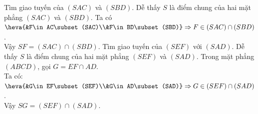 \begin{ex}
{\begin{itemchoice}
			 Tìm giao tuyến của $\left( SAC \right)$ và ${(S B D)}$.
			Dễ thấy ${S}$  là điểm chung của hai mặt phẳng ${(S A C)}$ và ${(S B D)}$.
			Ta có $\heva{&F\in AC\subset(SAC)\\&F\in BD\subset(SBD)}\Rightarrow F\in \left( SAC  \right)\cap \left( SBD \right) $.\\
			 Vậy $SF=\left( SAC \right)\cap \left( SBD \right)$.
			\itemch Tìm giao  tuyến của ${(S E F)}$ với ${(S A D)}$.
			Dễ thấy ${S}$ là điểm  chung của hai mặt phẳng ${(S E F)}$ và ${(S A D)}$.
			Trong mặt phẳng $\left( ABCD \right)$, gọi ${G=E F \cap  A D}$.\\
			Ta có: $\heva{&G\in EF\subset(SEF)\\&G\in AD\subset(SAD)}\Rightarrow G\in  \left( SEF \right)\cap \left( SAD \right)$.\\
			Vậy ${S G=(S E  F) \cap(S A D)}$.
		\end{itemchoice}
	 }
\end{ex}

